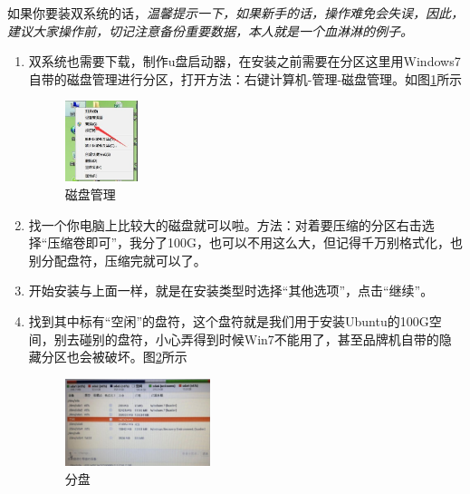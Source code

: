 \documentclass{article}
\begin{document}
如果你要装双系统的话，\textsl{{\color{red}温馨提示一下}，{\color{blue}如果新手的话，操作难免会失误，因此，建议大家操作前，切记注意备份重要数据，本人就是一个血淋淋的例子}。}
\begin{enumerate}
\item 双系统也需要下载，制作u盘启动器，在安装之前需要在分区这里用Windows7自带的磁盘管理进行分区，打开方法：右键计算机-管理-磁盘管理。如图\ref{tu21}所示
\begin{figure}[!htb] %
\centering
\includegraphics[width=0.2\textwidth]{tu21.jpeg}
\caption{\small 磁盘管理}
\label{tu21}
\end{figure} 

\item 找一个你电脑上比较大的磁盘就可以啦。方法：对着要压缩的分区右击选择“压缩卷即可”，我分了100G，也可以不用这么大，但记得千万别格式化，也别分配盘符，压缩完就可以了。

\item 开始安装与上面一样，就是在安装类型时选择“其他选项”，点击“继续”。

\item 找到其中标有“空闲”的盘符，这个盘符就是我们用于安装Ubuntu的100G空间，别去碰别的盘符，小心弄得到时候Win7不能用了，甚至品牌机自带的隐藏分区也会被破坏。图\ref{tu23}所示
\begin{figure}[!htb] %
\centering
\includegraphics[width=0.4\textwidth]{tu23.jpeg}
\caption{\small 分盘}
\label{tu23}
\end{figure} 


\end{enumerate}
\end{document}
